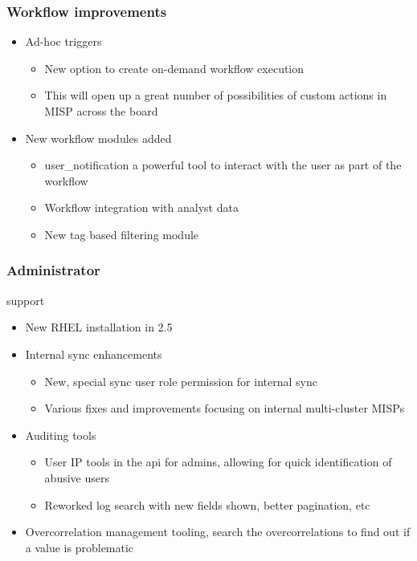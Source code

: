 \begin{frame}
  \frametitle{Workflow improvements}
  \begin{itemize}
       \item Ad-hoc triggers
       \begin{itemize}
           \item New option to create on-demand workflow execution
           \item This will open up a great number of possibilities of custom actions in MISP across the board
       \end{itemize}
       \item New workflow modules added
       \begin{itemize}
           \item user_notification a powerful tool to interact with the user as part of the workflow
           \item Workflow integration with analyst data
           \item New tag based filtering module
       \end{itemize}
  \end{itemize}
\end{frame}

\begin{frame}
  \frametitle{Administrator} support
  \begin{itemize}
       \item New RHEL installation in 2.5
       \item Internal sync enhancements
       \begin{itemize}
           \item New, special sync user role permission for internal sync
           \item Various fixes and improvements focusing on internal multi-cluster MISPs
       \end{itemize}
       \item Auditing tools
       \begin{itemize}
           \item User IP tools in the api for admins, allowing for quick identification of abusive users
           \item Reworked log search with new fields shown, better pagination, etc
       \end{itemize}
       \item Overcorrelation management tooling, search the overcorrelations to find out if a value is problematic
  \end{itemize}
\end{frame}

